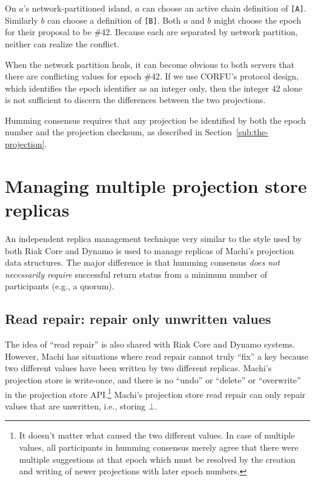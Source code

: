 \documentclass[preprint,10pt]{sigplanconf}
\begin{document}
On $a$'s network-partitioned island, $a$ can choose
an active chain definition of {\tt [A]}.
Similarly $b$ can choose a definition of {\tt [B]}.  Both $a$ and $b$
might choose the
epoch for their proposal to be \#42.  Because each are separated by
network partition, neither can realize the conflict.

When the network partition heals, it can become obvious to both
servers that there are conflicting values for epoch \#42.  If we
use CORFU's protocol design, which identifies the epoch identifier as
an integer only, then the integer 42 alone is not sufficient to
discern the differences between the two projections.

Humming consensus requires that any projection be identified by both
the epoch number and the projection checksum, as described in
Section~\ref{sub:the-projection}.

\section{Managing multiple projection store replicas}
\label{sec:managing-multiple-projection-stores}

An independent replica management technique very similar to the style
used by both Riak Core \cite{riak-core} and Dynamo is used to manage
replicas of Machi's projection data structures.
The major difference is that humming consensus
{\em does not necessarily require}
successful return status from a minimum number of participants (e.g.,
a quorum).

\subsection{Read repair: repair only unwritten values}

The idea of ``read repair'' is also shared with Riak Core and Dynamo
systems.  However, Machi has situations where read repair cannot truly
``fix'' a key because two different values have been written by two
different replicas.
Machi's projection store is write-once, and there is no ``undo'' or
``delete'' or ``overwrite'' in the projection store API.\footnote{It doesn't
matter what caused the two different values.  In case of multiple
values, all participants in humming consensus merely agree that there
were multiple suggestions at that epoch which must be resolved by the
creation and writing of newer projections with later epoch numbers.}
Machi's projection store read repair can only repair values that are
unwritten, i.e., storing $\bot$.
\end{document}
